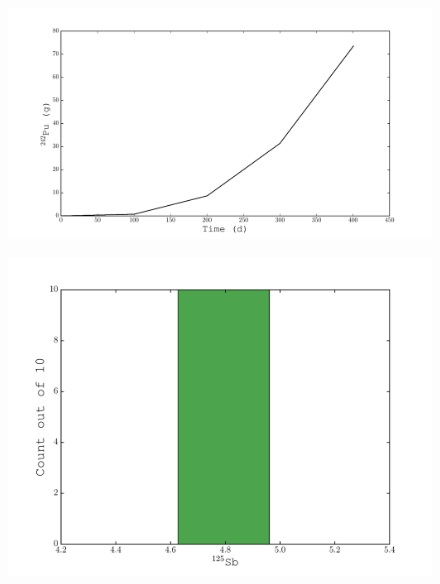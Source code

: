 \documentclass{beamer}
\begin{document}
\begin{frame}
    \begin{figure}[H]
    \begin{center}
      \includegraphics[width=0.77\columnwidth]{../Origen2/PLOTS/PU242Post_XY.pdf}
      \vspace{-5mm}
      \label{fig:POSTXYPu242}
    \end{center}
  \end{figure}
\end{frame}
    
\begin{frame}
  \begin{figure}[H]
    \begin{center}
      \includegraphics[width=0.77\columnwidth]{../Origen2/PLOTS/SB125Post_HIST.pdf}
      \vspace{-5mm}
      \label{fig:POSTHISTSb125}
    \end{center}
  \end{figure}
\end{frame}
  
\end{document}
